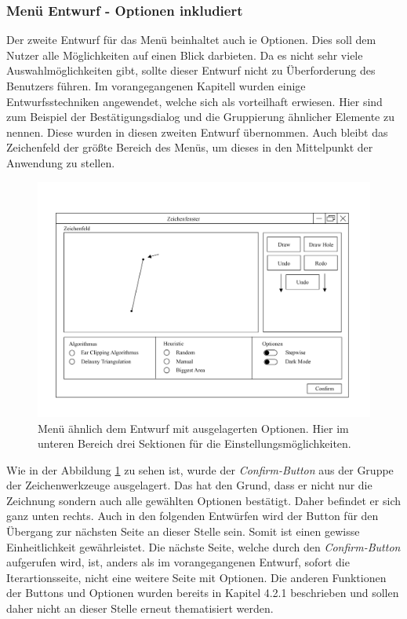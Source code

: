\subsubsection{Menü Entwurf - Optionen inkludiert}
Der zweite Entwurf für das Menü beinhaltet auch ie Optionen. Dies soll dem Nutzer alle Möglichkeiten auf einen Blick darbieten. Da es nicht sehr viele Auswahlmöglichkeiten gibt, sollte dieser Entwurf nicht zu Überforderung
des Benutzers führen. Im vorangegangenen Kapitell wurden einige Entwurfsstechniken angewendet, welche sich als vorteilhaft erwiesen. Hier sind zum Beispiel der Bestätigungsdialog und die Gruppierung ähnlicher Elemente zu nennen.
Diese wurden in diesen zweiten Entwurf übernommen. Auch bleibt das Zeichenfeld der größte Bereich des Menüs, um dieses in den Mittelpunkt der Anwendung zu stellen.

\begin{figure}[h]
    \includegraphics[width=1\textwidth]{bilder/menu_mit_optionen.png}
    \caption[Entwurf für das Menü mit Optionen]{Menü ähnlich dem Entwurf mit ausgelagerten Optionen. Hier im unteren Bereich drei Sektionen für die Einstellungsmöglichkeiten.}
    \label{fig:menu_mit_optionen}
\end{figure}

Wie in der Abbildung \ref{fig:menu_mit_optionen} zu sehen ist, wurde der \emph{Confirm-Button} aus der Gruppe der Zeichenwerkzeuge ausgelagert. Das hat den Grund, dass er nicht nur die Zeichnung sondern auch alle gewählten Optionen bestätigt.
Daher befindet er sich ganz unten rechts. Auch in den folgenden Entwürfen wird der Button für den Übergang zur nächsten Seite an dieser Stelle sein. Somit ist einen gewisse Einheitlichkeit gewährleistet.
Die nächste Seite, welche durch den \emph{Confirm-Button} aufgerufen wird, ist, anders als im vorangegangenen Entwurf, sofort die Iterartionsseite, nicht eine weitere Seite mit Optionen.
Die anderen Funktionen der Buttons und Optionen wurden bereits in Kapitel 4.2.1 beschrieben und sollen daher nicht an dieser Stelle erneut thematisiert werden.

